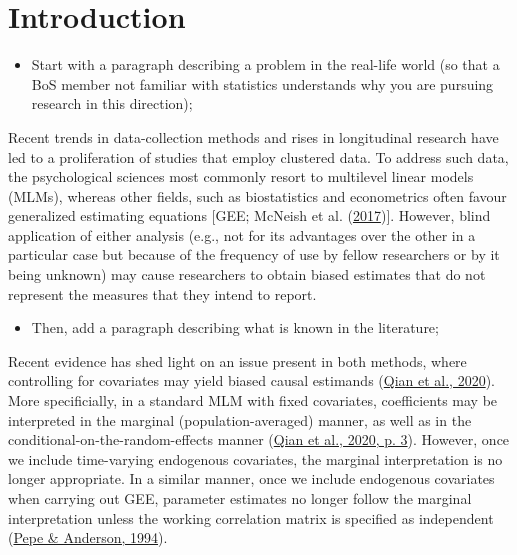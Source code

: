 \documentclass[
  12pt,
  a4paper,
]{article}
\providecommand{\tightlist}{%
  \setlength{\itemsep}{0pt}\setlength{\parskip}{0pt}}\usepackage{longtable,booktabs,array}
\begin{document}
\pagestyle{fancy}
  \fancyhead{}


\newpage

\hypertarget{introduction}{%
\section{Introduction}\label{introduction}}

\begin{itemize}
\tightlist
\item
  Start with a paragraph describing a problem in the real-life world (so
  that a BoS member not familiar with statistics understands why you are
  pursuing research in this direction);
\end{itemize}

Recent trends in data-collection methods and rises in longitudinal
research have led to a proliferation of studies that employ clustered
data. To address such data, the psychological sciences most commonly
resort to multilevel linear models (MLMs), whereas other fields, such as
biostatistics and econometrics often favour generalized estimating
equations {[}GEE; McNeish et al.
(\protect\hyperlink{ref-mcneish2017}{2017}){]}. However, blind
application of either analysis (e.g., not for its advantages over the
other in a particular case but because of the frequency of use by fellow
researchers or by it being unknown) may cause researchers to obtain
biased estimates that do not represent the measures that they intend to
report.

\begin{itemize}
\tightlist
\item
  Then, add a paragraph describing what is known in the literature;
\end{itemize}

Recent evidence has shed light on an issue present in both methods,
where controlling for covariates may yield biased causal estimands
(\protect\hyperlink{ref-qian2020}{Qian et al., 2020}). More
specificially, in a standard MLM with fixed covariates, coefficients may
be interpreted in the marginal (population-averaged) manner, as well as
in the conditional-on-the-random-effects manner
(\protect\hyperlink{ref-qian2020}{Qian et al., 2020, p. 3}). However,
once we include time-varying endogenous covariates, the marginal
interpretation is no longer appropriate. In a similar manner, once we
include endogenous covariates when carrying out GEE, parameter estimates
no longer follow the marginal interpretation unless the working
correlation matrix is specified as independent
(\protect\hyperlink{ref-pepe1994}{Pepe \& Anderson, 1994}).
\end{document}
